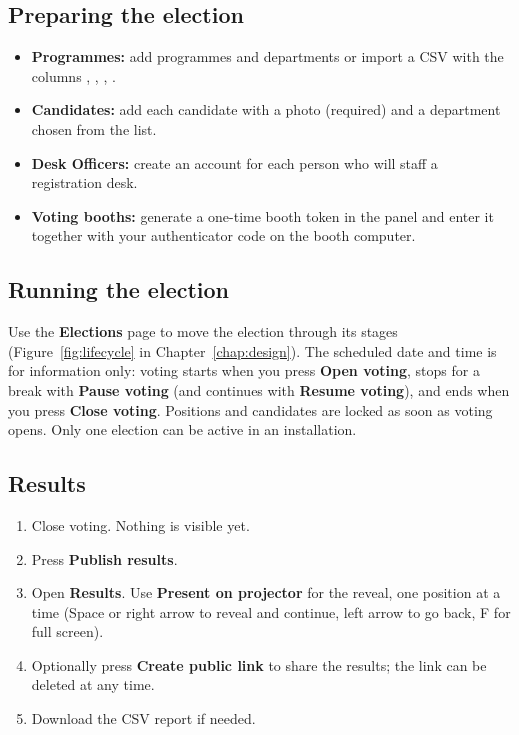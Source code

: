 \subsection{Preparing the election}

\begin{itemize}
  \item \textbf{Programmes:} add programmes and departments or import a CSV with the columns , , , .
  \item \textbf{Candidates:} add each candidate with a photo (required) and a department chosen from the list.
  \item \textbf{Desk Officers:} create an account for each person who will staff a registration desk.
  \item \textbf{Voting booths:} generate a one-time booth token in the panel and enter it together with your authenticator code on the booth computer.
\end{itemize}

\subsection{Running the election}

Use the \textbf{Elections} page to move the election through its stages (Figure~\ref{fig:lifecycle} in Chapter~\ref{chap:design}). The scheduled date and time is for information only: voting starts when you press \textbf{Open voting}, stops for a break with \textbf{Pause voting} (and continues with \textbf{Resume voting}), and ends when you press \textbf{Close voting}. Positions and candidates are locked as soon as voting opens. Only one election can be active in an installation.

\subsection{Results}

\begin{enumerate}
  \item Close voting. Nothing is visible yet.
  \item Press \textbf{Publish results}.
  \item Open \textbf{Results}. Use \textbf{Present on projector} for the reveal, one position at a time (Space or right arrow to reveal and continue, left arrow to go back, F for full screen).
  \item Optionally press \textbf{Create public link} to share the results; the link can be deleted at any time.
  \item Download the CSV report if needed.
\end{enumerate}

